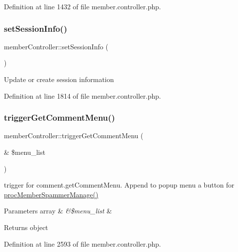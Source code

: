 Definition at line 1432 of file member.\+controller.\+php.

\hypertarget{classmemberController_ae4175b4a60e0b3000ed12e36508720ad}{}\label{classmemberController_ae4175b4a60e0b3000ed12e36508720ad} 
\subsubsection{\texorpdfstring{set\+Session\+Info()}{setSessionInfo()}}
{\footnotesize\ttfamily member\+Controller\+::set\+Session\+Info (\begin{DoxyParamCaption}{ }\end{DoxyParamCaption})}

Update or create session information 

Definition at line 1814 of file member.\+controller.\+php.

\hypertarget{classmemberController_aa97406ab4da679f7b54cceb404bd563f}{}\label{classmemberController_aa97406ab4da679f7b54cceb404bd563f} 
\subsubsection{\texorpdfstring{trigger\+Get\+Comment\+Menu()}{triggerGetCommentMenu()}}
{\footnotesize\ttfamily member\+Controller\+::trigger\+Get\+Comment\+Menu (\begin{DoxyParamCaption}\item[{\&}]{\$menu\+\_\+list }\end{DoxyParamCaption})}

trigger for comment.\+get\+Comment\+Menu. Append to popup menu a button for \hyperlink{classmemberController_a99f87aecac7ae283cec747a007df88b8}{proc\+Member\+Spammer\+Manage()}


\begin{DoxyParams}[1]{Parameters}
array & {\em \&\$menu\+\_\+list} & \\
\hline
\end{DoxyParams}
\begin{DoxyReturn}{Returns}
object 
\end{DoxyReturn}


Definition at line 2593 of file member.\+controller.\+php.

